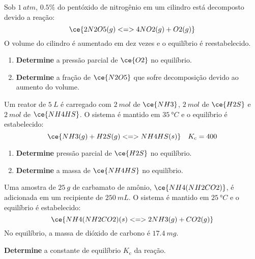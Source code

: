 \begin{problem}[
	id={2F56},
	path={/home/braun/Documents/Developer/braunchem/data/problems/Q2/2F/2F56}
]
Sob {\(\qty{1}{\unit{atm}}\)}, {\(\num{0,5}\%\)} do pentóxido de nitrogênio em um cilindro está decomposto devido a reação: {\[
    \ce{ 2 N2O5(g) <=> 4 NO2(g) + O2(g) }
\]} O volume do cilindro é aumentado em dez vezes e o equilíbrio é reestabelecido.

\begin{enumerate}
\def\labelenumi{\alph{enumi}.}
\tightlist
\item
  \textbf{Determine} a pressão parcial de {\(\ce{O2}\)} no equilíbrio.
\item
  \textbf{Determine} a fração de {\(\ce{N2O5}\)} que sofre decomposição devido ao aumento do volume.
\end{enumerate}

\end{problem}


\begin{problem}[
	id={2F57},
	path={/home/braun/Documents/Developer/braunchem/data/problems/Q2/2F/2F57}
]
Um reator de {\(\qty{5}{\unit{L}}\)} é carregado com {\(\qty{2}{\unit{mol}}\)} de {\(\ce{NH3}\)}, {\(\qty{2}{\unit{mol}}\)} de {\(\ce{H2S}\)} e
{\(\qty{2}{\unit{mol}}\)} de {\(\ce{NH4HS}\)}. O sistema é mantido em {\(\qty{35}{\unit{\degree C}}\)} e o equilíbrio é estabelecido: {\[
    \ce{ NH3(g) + H2S(g) <=> NH4HS(s) } \quad K_\mathrm{c} = 400
\]}

\begin{enumerate}
\def\labelenumi{\alph{enumi}.}
\tightlist
\item
  \textbf{Determine} pressão parcial de {\(\ce{H2S}\)} no equilíbrio.
\item
  \textbf{Determine} a massa de {\(\ce{NH4HS}\)} no equilíbrio.
\end{enumerate}

\end{problem}


\begin{problem}[
	id={2F58},
	path={/home/braun/Documents/Developer/braunchem/data/problems/Q2/2F/2F58}
]
Uma amostra de {\(\qty{25}{\unit{g}}\)} de carbamato de amônio, {\(\ce{NH4(NH2CO2)}\)}, é adicionada em um recipiente de {\(\qty{250}{\unit{mL}}\)}. O
sistema é mantido em {\(\qty{25}{\unit{\degree C}}\)} e o equilíbrio é estabelecido: {\[
\ce{ NH4(NH2CO2)(s) <=> 2 NH3(g) + CO2(g) }
\]} No equilíbrio, a massa de dióxido de carbono é {\(\qty{17,4}{\unit{mg}}\)}.

\textbf{Determine} a constante de equilíbrio {\(K_\mathrm{c}\)} da reação.

\end{problem}



